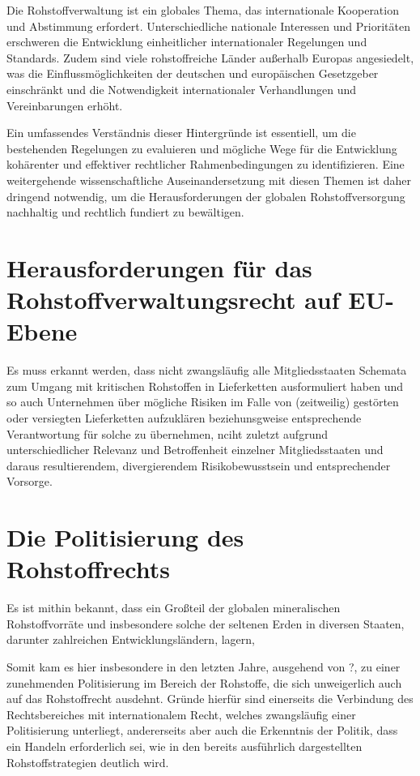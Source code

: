 \documentclass[12pt,a4paper,oneside]{book} %
\begin{document}
	Die Rohstoffverwaltung ist ein globales Thema, das internationale Kooperation und Abstimmung erfordert. Unterschiedliche nationale Interessen und Prioritäten erschweren die Entwicklung einheitlicher internationaler Regelungen und Standards. Zudem sind viele rohstoffreiche Länder außerhalb Europas angesiedelt, was die Einflussmöglichkeiten der deutschen und europäischen Gesetzgeber einschränkt und die Notwendigkeit internationaler Verhandlungen und Vereinbarungen erhöht.
	
	Ein umfassendes Verständnis dieser Hintergründe ist essentiell, um die bestehenden Regelungen zu evaluieren und mögliche Wege für die Entwicklung kohärenter und effektiver rechtlicher Rahmenbedingungen zu identifizieren. Eine weitergehende wissenschaftliche Auseinandersetzung mit diesen Themen ist daher dringend notwendig, um die Herausforderungen der globalen Rohstoffversorgung nachhaltig und rechtlich fundiert zu bewältigen.
	
	
	
	\section{Herausforderungen für das Rohstoffverwaltungsrecht auf EU-Ebene}
	Es muss erkannt werden, dass nicht zwangsläufig alle Mitgliedsstaaten Schemata zum Umgang mit kritischen Rohstoffen in Lieferketten ausformuliert haben und so auch Unternehmen über mögliche Risiken im Falle von (zeitweilig) gestörten oder versiegten Lieferketten aufzuklären beziehunsgweise entsprechende Verantwortung für solche zu übernehmen, nciht zuletzt aufgrund unterschiedlicher Relevanz und Betroffenheit einzelner Mitgliedsstaaten und daraus resultierendem, divergierendem Risikobewusstsein und entsprechender Vorsorge.
	
	
	\section{Die Politisierung des Rohstoffrechts}
	
	Es ist mithin bekannt, dass ein Großteil der globalen mineralischen Rohstoffvorräte und insbesondere solche der seltenen Erden in diversen Staaten, darunter zahlreichen Entwicklungsländern, lagern, 
	
	Somit kam es hier insbesondere in den letzten Jahre, ausgehend von ?, zu einer zunehmenden Politisierung im Bereich der Rohstoffe, die sich unweigerlich auch auf das Rohstoffrecht ausdehnt. Gründe hierfür sind einerseits die Verbindung des Rechtsbereiches mit internationalem Recht, welches zwangsläufig einer Politisierung unterliegt, andererseits aber auch die Erkenntnis der Politik, dass ein Handeln erforderlich sei, wie in den bereits ausführlich dargestellten Rohstoffstrategien deutlich wird.
	
\end{document}
